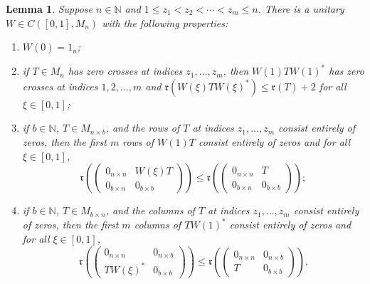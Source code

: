 \documentclass[12pt]{amsart}
\numberwithin{equation}{section}
\newtheorem{lemma}[theorem]{Lemma}
\theoremstyle{definition}
\theoremstyle{remark}
\newcommand{\NN}{\mathbb{N}}
\begin{document}
\begin{lemma}
	\label{matrix}
	Suppose $n\in\NN$ and $1\leq z_{1}<z_{2}<\cdots<z_{m}\leq n$. There is a unitary $W\in C([0,1],M_{n})$  with the following properties:
	\begin{enumerate}[label=(\alph*)]
		\item $W(0)=1_{n}$;
		\item  if $T\in M_{n}$ has zero crosses at indices $z_{1},\ldots,z_{m}$, then $W(1)TW(1)^{*}$ has zero crosses at indices $1,2,\ldots,m$ and $\mathfrak{r}(W(\xi)TW(\xi)^{*})\leq\mathfrak{r}(T)+2$ for all $\xi\in[0,1]$;
		\item if $b\in\NN$, $T\in M_{n\times b}$, and the rows of $T$ at indices $z_{1},\ldots,z_{m}$  consist entirely of zeros, then the first $m$ rows of $W(1)T$ consist entirely of zeros and for all $\xi\in[0,1]$, 
		$$
		\mathfrak{r}\left(
		\begin{pmatrix}
		0_{n\times n} & W(\xi)T\\
		0_{b\times n} & 0_{b\times b}
		\end{pmatrix}
		\right)\leq\mathfrak{r}\left(
		\begin{pmatrix}
		0_{n\times n} & T\\
		0_{b\times n} & 0_{b\times b}
		\end{pmatrix}
		\right);
		$$  
		\item if $b\in\NN$, $T\in M_{b\times n}$, and the columns of $T$ at indices $z_{1},\ldots,z_{m}$ consist entirely of zeros, then the first $m$ columns of $TW(1)^{*}$ consist entirely of zeros and for all $\xi\in[0,1]$, 
		$$
		\mathfrak{r}\left(
		\begin{pmatrix}
		0_{n\times n} & 0_{n\times b}\\
		TW(\xi)^{*} & 0_{b\times b}
		\end{pmatrix}
		\right)\leq\mathfrak{r}\left(
		\begin{pmatrix}
		0_{n\times n} & 0_{n\times b}\\
		T & 0_{b\times b}
		\end{pmatrix}
		\right).
		$$ 
	\end{enumerate} 
\end{lemma}	
\end{document}
